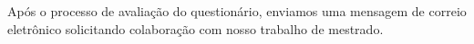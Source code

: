 Após o processo de avaliação do questionário, enviamos uma mensagem de correio
eletrônico solicitando colaboração com nosso trabalho de mestrado.








